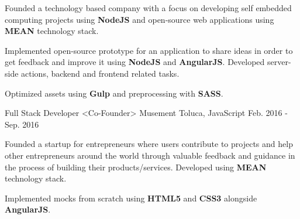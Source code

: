 \begin{cventries}
{\begin{cvitems}
        \item {Founded a technology based company with a focus on developing self embedded computing projects using \textbf{NodeJS} and open-source web applications using \textbf{MEAN} technology stack. }
        \item {Implemented open-source prototype for an application to share ideas in order to get feedback and improve it using \textbf{NodeJS} and \textbf{AngularJS}. Developed server-side actions, backend  and frontend related tasks. }
        \item {Optimized assets using \textbf{Gulp} and preprocessing with \textbf{SASS}. }
      \end{cvitems} 
    }
  \cventry
    {Full Stack Developer <Co-Founder>}
    {Musement}
    {Toluca, JavaScript}
    {Feb. 2016 - Sep. 2016}
    {
      \begin{cvitems}
        \item {Founded a startup for entrepreneurs where users contribute to projects and help other entrepreneurs around the world through valuable feedback and guidance in the process of building their products/services. Developed using \textbf{MEAN} technology stack.}
        \item {Implemented mocks from scratch using \textbf{HTML5} and \textbf{CSS3} alongside \textbf{AngularJS}. }
      \end{cvitems}
    }
\end{cventries}
